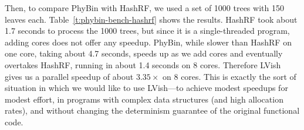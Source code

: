 Then, to compare PhyBin with HashRF, we used a set of 1000 trees with
150 leaves each.  Table~\ref{t:phybin-bench-hashrf} shows the results.
HashRF took about 1.7 seconds to process the 1000 trees, but since it
is a single-threaded program, adding cores does not offer any speedup.
PhyBin, while slower than HashRF on one core, taking about 4.7
seconds, speeds up as we add cores and eventually overtakes HashRF,
running in about 1.4 seconds on 8 cores.  Therefore LVish gives us a
parallel speedup of about $3.35\times$ on 8 cores.  This is exactly
the sort of situation in which we would like to use LVish---to achieve
modest speedups for modest effort, in programs with complex data
structures (and high allocation rates), and without changing the
determinism guarantee of the original functional code.
